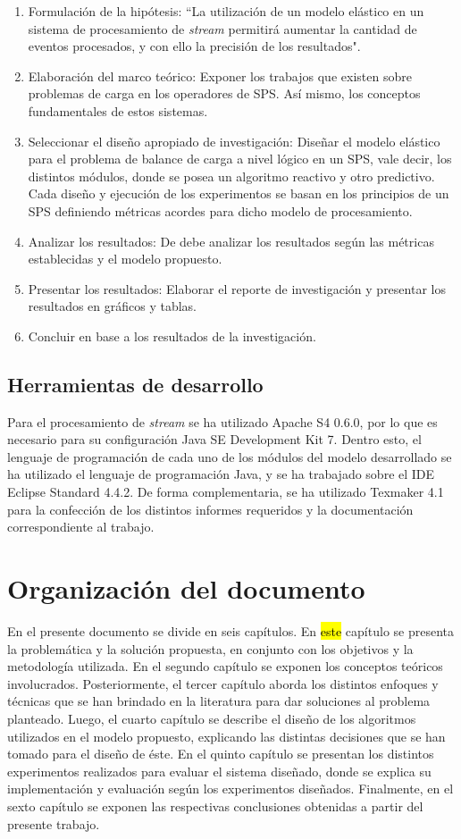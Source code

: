 \begin{enumerate}
	\item Formulación de la hipótesis: ``La utilización de un modelo elástico en un sistema de procesamiento de \textit{stream} permitirá aumentar la cantidad de eventos procesados, y con ello la precisión de los resultados".
	\item Elaboración del marco teórico: Exponer los trabajos que existen sobre problemas de carga en los operadores de SPS. Así mismo, los conceptos fundamentales de estos sistemas.
	\item Seleccionar el diseño apropiado de investigación: Diseñar el modelo elástico para el problema de balance de carga a nivel lógico en un SPS, vale decir, los distintos módulos, donde se posea un algoritmo reactivo y otro predictivo. Cada diseño y ejecución de los experimentos se basan en los principios de un SPS definiendo métricas acordes para dicho modelo de procesamiento.
	\item Analizar los resultados: De debe analizar los resultados según las métricas establecidas y el modelo propuesto.
	\item Presentar los resultados: Elaborar el reporte de investigación y presentar los resultados en gráficos y tablas.
	\item Concluir en base a los resultados de la investigación.
\end{enumerate}

\subsection{Herramientas de desarrollo}
Para el procesamiento de \textit{stream} se ha utilizado Apache S4 0.6.0, por lo que es necesario para su configuración Java SE Development Kit 7. Dentro esto, el lenguaje de programación de cada uno de los módulos del modelo desarrollado se ha utilizado el lenguaje de programación Java, y se ha trabajado sobre el IDE Eclipse Standard 4.4.2. De forma complementaria, se ha utilizado Texmaker 4.1 para la confección de los distintos informes requeridos y la documentación correspondiente al trabajo.

\section{Organización del documento}
\label{intro:organizacion}
En el presente documento se divide en seis capítulos. En \hl{este} capítulo se presenta la problemática y la solución propuesta, en conjunto con los objetivos y la metodología utilizada. En el segundo capítulo se exponen los conceptos teóricos involucrados. Posteriormente, el tercer capítulo aborda los distintos enfoques y técnicas que se han brindado en la literatura para dar soluciones al problema planteado. Luego, el cuarto capítulo se describe el diseño de los algoritmos utilizados en el modelo propuesto, explicando las distintas decisiones que se han tomado para el diseño de éste. En el quinto capítulo se presentan los distintos experimentos realizados para evaluar el sistema diseñado, donde se explica su implementación y evaluación según los experimentos diseñados. Finalmente, en el sexto capítulo se exponen las respectivas conclusiones obtenidas a partir del presente trabajo.